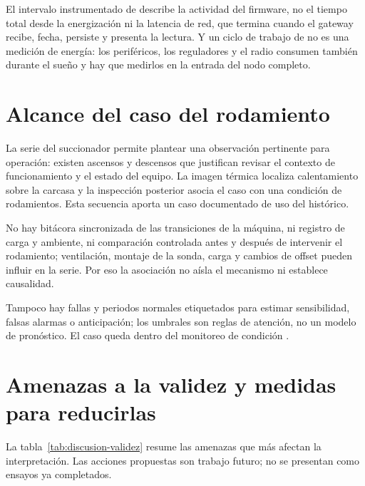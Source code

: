 El intervalo instrumentado de \TiempoActivo{} describe la actividad del firmware, no el tiempo total desde la energización ni la latencia de red, que termina cuando el gateway recibe, fecha, persiste y presenta la lectura. Y un ciclo de trabajo de \CicloTrabajo{} no es una medición de energía: los periféricos, los reguladores y el radio consumen también durante el sueño y hay que medirlos en la entrada del nodo completo.

\section{Alcance del caso del rodamiento}
La serie del succionador permite plantear una observación pertinente para operación: existen ascensos y descensos que justifican revisar el contexto de funcionamiento y el estado del equipo. La imagen térmica localiza calentamiento sobre la carcasa y la inspección posterior asocia el caso con una condición de rodamientos. Esta secuencia aporta un caso documentado de uso del histórico.

No hay bitácora sincronizada de las transiciones de la máquina, ni registro de carga y ambiente, ni comparación controlada antes y después de intervenir el rodamiento; ventilación, montaje de la sonda, carga y cambios de offset pueden influir en la serie. Por eso la asociación no aísla el mecanismo ni establece causalidad.

Tampoco hay fallas y periodos normales etiquetados para estimar sensibilidad, falsas alarmas o anticipación; los umbrales son reglas de atención, no un modelo de pronóstico. El caso queda dentro del monitoreo de condición \citep{jardine2006,cinar2020}.

\section{Amenazas a la validez y medidas para reducirlas}
\label{sec:discusion-validez}
La tabla~\ref{tab:discusion-validez} resume las amenazas que más afectan la interpretación. Las acciones propuestas son trabajo futuro; no se presentan como ensayos ya completados.

